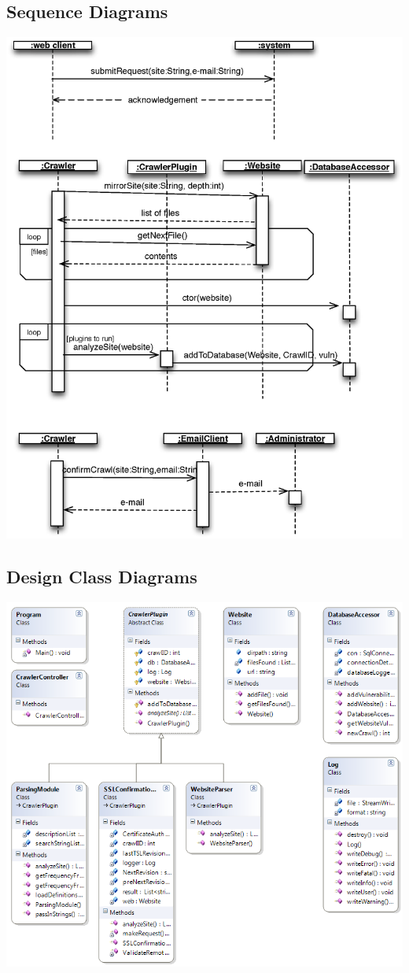 \documentclass{article}
\begin{document}
\subsection{Sequence Diagrams}
\includegraphics[width=\textwidth]{SeqDia}
\newpage
\subsection{Design Class Diagrams}
\includegraphics[width=\textwidth]{DCD}
\end{document}
